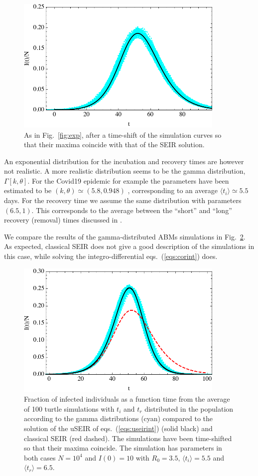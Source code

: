 \documentclass[a4paper,oneside,11pt]{article}
\begin{document}
   \begin{figure}[h!]
  \centering
  \includegraphics[width=10cm]{expshift.pdf}
  \caption{ As in Fig.~\ref{fig:exp}, after a time-shift of the simulation curves so that their maxima coincide with that of the SEIR solution.  }
  \label{fig:expshift}
   \end{figure}

 An exponential distribution for the incubation and recovery times are however not realistic. A more realistic distribution seems to be the  gamma distribution, $\Gamma[k,\theta]$. For the Covid19 epidemic for example the parameters have been estimated to be $(k,\theta) \simeq (5.8, 0.948)$ \cite{Hellewell2020}, corresponding to an average $\langle t_i\rangle \simeq 5.5$days. For the recovery time we  assume the same distribution with parameters $(6.5,1)$. This corresponds to the average between the ``short'' and ``long'' recovery (removal) times discussed in \cite{Hellewell2020}.

We compare the results of the gamma-distributed ABMs simulations in Fig.~\ref{fig:expvsgamma}. As expected, classical SEIR does not give a good description of the simulations in this case, while solving the integro-differential eqs.~(\ref{eqs:corint}) does. 
\begin{figure}[h!]
  \centering
  \includegraphics[width=10cm]{GGvsSEIRshift.pdf}
  \caption{ Fraction of infected individuals as a function time from the average of 100 turtle simulations with $t_i$ and $t_r$ distributed in the population according to the gamma distributions (cyan) compared to the solution of the uSEIR of eqs.~(\ref{eqs:useirint}) (solid black) and classical SEIR (red dashed). The simulations have been time-shifted so that their maxima coincide. The simulation has parameters in both cases $N=10^4$ and $I(0)=10$ with $R_0=3.5$, $\langle t_i\rangle=5.5$ and $\langle t_r\rangle=6.5$.  }
  \label{fig:expvsgamma}
   \end{figure}
   
\end{document}
